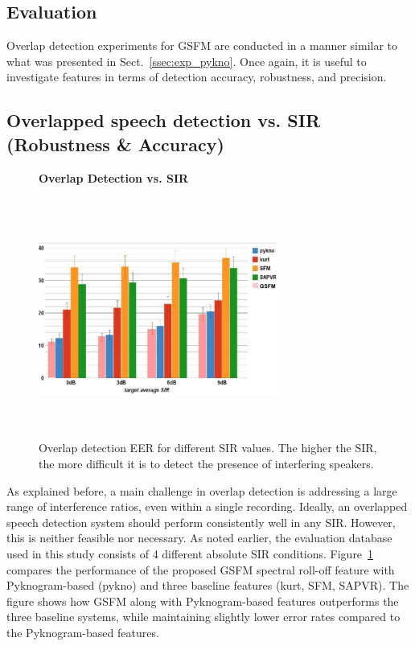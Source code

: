 {\subsection{Evaluation}
\label{ssec:exp_gsfm}
Overlap detection experiments for GSFM are conducted in a manner similar to what was presented in Sect.~\ref{ssec:exp_pykno}. 
Once again, it is useful to investigate features in terms of detection accuracy, robustness, and precision. 

\vspace{3mm}
\subsection{Overlapped speech detection vs. SIR (Robustness \& Accuracy)}
\label{sssec:ovl_frame_vs_sir_gsfm}
\begin{figure}[b!]
	\centering
	\hspace{-1mm}
	\textbf{Overlap Detection vs. SIR}\par\medskip
	\includegraphics[height = 3.1in, width=0.7\textwidth]{figures/ovl_det_vs_sir_gsfm}
	\vspace{-1mm}
	\caption{ Overlap detection EER for different SIR values. The higher the SIR, the more difficult it is to detect the presence of interfering speakers.}
	\vspace{0mm}
	\label{fig:ch2_ovl_det_gsfm}
\end{figure}

As explained before, a main challenge in overlap detection is addressing a large range of interference ratios, even within a single recording. 
Ideally, an overlapped speech detection system should perform consistently well in any SIR. 
However, this is neither feasible nor necessary. 
As noted earlier, the evaluation database used in this study consists of 4 different absolute SIR conditions. 
Figure~\ref{fig:ch2_ovl_det_gsfm} compares the performance of the proposed GSFM spectral roll-off feature with Pyknogram-based (pykno) and three baseline features (kurt, SFM, SAPVR). 
The figure shows how GSFM along with Pyknogram-based features outperforms the three baseline systems, while maintaining slightly lower error rates compared to the Pyknogram-based features.

}
